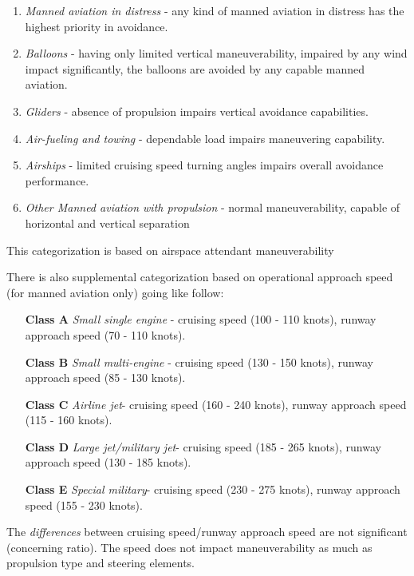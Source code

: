 \begin{enumerate}
    \item \emph{Manned aviation in distress} - any kind of manned aviation in distress has the highest priority in avoidance.
    
    \item \emph{Balloons} - having only limited vertical maneuverability, impaired by any wind impact significantly, the balloons are avoided by any capable manned aviation.
    
    \item \emph{Gliders} - absence of propulsion impairs vertical avoidance capabilities.
    
    \item \emph{Air-fueling and towing} - dependable load impairs maneuvering capability.
    
    \item \emph{Airships} - limited cruising speed turning angles impairs overall avoidance performance.
    
    \item \emph{Other Manned aviation with propulsion} - normal maneuverability, capable of horizontal and vertical separation
\end{enumerate}

\begin{note}
    This categorization is based on airspace attendant maneuverability    
\end{note}

\noindent There is also supplemental categorization based on operational approach speed (for manned aviation only) \cite{doc20068168} going like follow:
\begin{enumerate}
    \item[\textbf{Class A}] \emph{Small single engine} - cruising speed (100 - 110 knots), runway approach speed (70 - 110 knots).
    
    \item[\textbf{Class B}] \emph{Small multi-engine} - cruising speed (130 - 150 knots), runway approach speed (85 - 130 knots).
    
    \item[\textbf{Class C}] \emph{Airline jet}- cruising speed (160 - 240 knots), runway approach speed (115 - 160 knots).
    
    \item[\textbf{Class D}] \emph{Large jet/military jet}- cruising speed (185 - 265 knots), runway approach speed (130 - 185 knots).
    
    \item[\textbf{Class E}] \emph{Special military}- cruising speed (230 - 275 knots), runway approach speed (155 - 230 knots).
\end{enumerate}

\begin{note}
    The \emph{differences} between cruising speed/runway approach speed are not significant (concerning ratio). The speed does not impact maneuverability as much as propulsion type and steering elements.
\end{note}